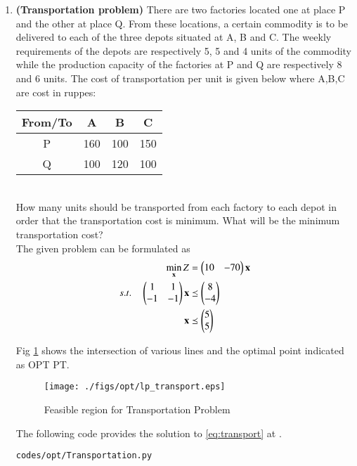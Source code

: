 \begin{enumerate}[label=\thesubsection.\arabic*.,ref=\thesubsection.\theenumi]
\item \textbf{(Transportation problem)} There are two factories located one at
place P and the other at place Q. From these locations, a certain commodity is to be
delivered to each of the three depots situated at A, B and C. The weekly requirements
of the depots are respectively 5, 5 and 4 units of the commodity while the production
capacity of the factories at P and Q are respectively 8 and 6 units. The cost of transportation per unit is given below where A,B,C are cost in ruppes:\\
\begin{tabular}{|c|c|c|c|}
\hline
From/To & A & B & C\\
\hline
P & 160 & 100 & 150\\
\hline
Q & 100 &120 & 100\\
\hline
\end{tabular}\\
How many units should be transported from each factory to each depot in order that
the transportation cost is minimum. What will be the minimum transportation cost?
\\
\solution The given problem can be formulated as
\begin{align}
\min_{\mathbf{x}} Z &= \begin{pmatrix}10 & -70\end{pmatrix}\mathbf{x}
\\
s.t. \quad 
\begin{pmatrix}
1 & 1
\\
-1 & -1
\end{pmatrix}
\mathbf{x} & \preceq \begin{pmatrix}8\\-4\end{pmatrix}
\\
\mathbf{x} &\preceq \begin{pmatrix}5\\5\end{pmatrix}
\label{eq:transport}
\end{align}

Fig  \ref{fig:transport}
shows the intersection of various lines and the optimal point indicated as OPT PT.
\begin{figure}[h]
\texttt{[image: ./figs/opt/lp\_transport.eps]}
\caption{Feasible region for Transportation Problem}
\caption{}
\label{fig:transport}
\end{figure}

The following code provides the solution to \eqref{eq:transport} at .
%
\begin{lstlisting}
codes/opt/Transportation.py
\end{lstlisting}





\end{enumerate}
%    
    
